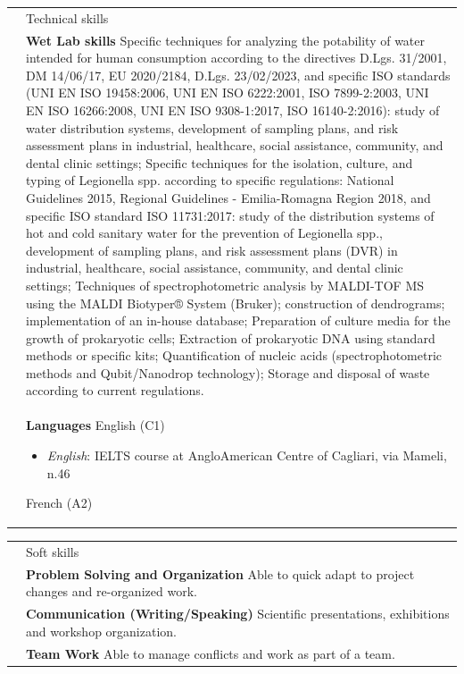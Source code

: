 \documentclass[letterpaper, 11pt]{article}
\newcommand{\headingfont}{\Large\color{OliveGreen}}
\newenvironment{SectionTable}[1]{
	\renewcommand*{\arraystretch}{1.7}
	\setlength{\tabcolsep}{10pt}
	\begin{longtable}{Rp{5.4in}} & #1 \\}
{\end{longtable}\vspace{-.3cm}}
\begin{document}
\begin{SectionTable}{\headingfont Technical skills}
& \textbf{Wet Lab skills}\newline
Specific techniques for analyzing the potability of water intended for human consumption according to the directives D.Lgs. 31/2001, DM 14/06/17, EU 2020/2184, D.Lgs. 23/02/2023, and specific ISO standards (UNI EN ISO 19458:2006, UNI EN ISO 6222:2001, ISO 7899-2:2003, UNI EN ISO 16266:2008, UNI EN ISO 9308-1:2017, ISO 16140-2:2016): study of water distribution systems, development of sampling plans, and risk assessment plans in industrial, healthcare, social assistance, community, and dental clinic settings;\newline
Specific techniques for the isolation, culture, and typing of Legionella spp. according to specific regulations: National Guidelines 2015, Regional Guidelines - Emilia-Romagna Region 2018, and specific ISO standard ISO 11731:2017: study of the distribution systems of hot and cold sanitary water for the prevention of Legionella spp., development of sampling plans, and risk assessment plans (DVR) in industrial, healthcare, social assistance, community, and dental clinic settings;\newline
Techniques of spectrophotometric analysis by MALDI-TOF MS using the MALDI Biotyper® System (Bruker); construction of dendrograms; implementation of an in-house database;\newline
Preparation of culture media for the growth of prokaryotic cells;\newline
Extraction of prokaryotic DNA using standard methods or specific kits;\newline
Quantification of nucleic acids (spectrophotometric methods and Qubit/Nanodrop technology);\newline
Storage and disposal of waste according to current regulations.\\


& \textbf{Languages} \newline
English (C1)
\begin{itemize}[itemsep=0pt, leftmargin=*]
\item \textit{English}: IELTS course at AngloAmerican Centre of Cagliari,\newline
via Mameli, n.46
\end{itemize}
French (A2)
\end{SectionTable}

\begin{SectionTable}{\headingfont Soft skills}

& \textbf{Problem Solving and Organization}\newline
Able to quick adapt to project changes and re-organized work.\\

& \textbf{Communication (Writing/Speaking)}\newline
Scientific presentations, exhibitions and workshop organization.\\

& \textbf{Team Work}\newline
Able to manage conflicts and work as part of a team.\\

\end{SectionTable}
\end{document}
